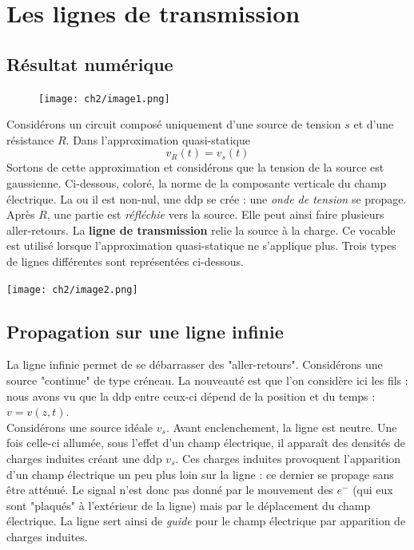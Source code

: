 \chapter{Les lignes de transmission}

\section{Résultat numérique}
\begin{figure}
	\vspace{-5mm}
	\texttt{[image: ch2/image1.png]}
\end{figure}
Considérons un circuit composé uniquement d'une source de tension $s$ et d'une résistance $R$. Dans 
l'approximation quasi-statique
\begin{equation}
v_R(t) = v_s(t)
\end{equation}
Sortons de cette approximation et considérons que la tension de la source est gaussienne. Ci-dessous, 
coloré, la norme de la composante verticale du champ électrique. La ou il est non-nul, une ddp 
se crée : une \textit{onde de tension} se propage. Après $R$, une partie est \textit{réfléchie} vers 
la source. Elle peut ainsi faire plusieurs aller-retours. La \textbf{ligne de transmission} relie 
la source à la charge. Ce vocable est utilisé lorsque l'approximation quasi-statique ne s'applique 
plus. Trois types de lignes différentes sont représentées ci-dessous.
\begin{center}
	\texttt{[image: ch2/image2.png]}
\end{center}

\section{Propagation sur une ligne infinie}
La ligne infinie permet de se débarrasser des "aller-retours". Considérons une source "continue" 
de type créneau. La nouveauté est que l'on considère ici les fils : nous avons vu que la ddp entre 
ceux-ci dépend de la position et du temps : $v=v(z,t)$.\\
Considérons une source idéale $v_s$. Avant enclenchement, la ligne est neutre. Une fois celle-ci 
allumée, sous l'effet d'un champ électrique, il apparaît des densités de charges induites 
créant une ddp $v_s$. Ces charges induites provoquent l'apparition d'un champ électrique un peu 
plus loin sur la ligne : ce dernier se propage sans être atténué. Le signal n'est donc pas donné 
par le mouvement des $e^-$ (qui eux sont "plaqués" à l'extérieur de la ligne) mais par le déplacement 
du champ électrique. La ligne sert ainsi de \textit{guide} pour le champ électrique par apparition 
de charges induites.\newpage


